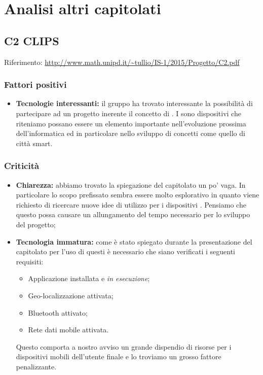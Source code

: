 \documentclass{scalatekids-article}
\begin{document}
\section{Analisi altri capitolati}
\subsection{C2 CLIPS}
Riferimento: \url{http://www.math.unipd.it/~tullio/IS-1/2015/Progetto/C2.pdf}\\
\subsubsection{Fattori positivi}
\begin{itemize}
\item \textbf{Tecnologie interessanti:} il gruppo ha trovato interessante la possibilità di partecipare ad un progetto inerente il concetto di .
I  sono dispositivi che riteniamo possano essere un elemento importante nell'evoluzione prossima dell'informatica ed in particolare nello sviluppo di concetti come quello di città smart.
\end{itemize}
\subsubsection{Criticità}
\begin{itemize}
\item \textbf{Chiarezza:} abbiamo trovato la spiegazione del capitolato un po' vaga.
In particolare lo scopo prefissato sembra essere molto esplorativo in quanto viene richiesto di ricercare nuove idee di utilizzo per i dispositivi . Pensiamo che questo possa causare un allungamento del tempo necessario per lo sviluppo del progetto;
\item \textbf{Tecnologia immatura:} come è stato spiegato durante la presentazione del capitolato per l'uso di questi  è necessario che siano verificati i seguenti requisiti:
  \begin{itemize}
  \item Applicazione installata e \textit{in esecuzione};
  \item Geo-localizzazione attivata;
  \item Bluetooth attivato;
  \item Rete dati mobile attivata.
  \end{itemize}
  Questo comporta a nostro avviso un grande dispendio di risorse per i dispositivi mobili dell'utente finale e lo troviamo un grosso fattore penalizzante.
\end{itemize}
\end{document}
